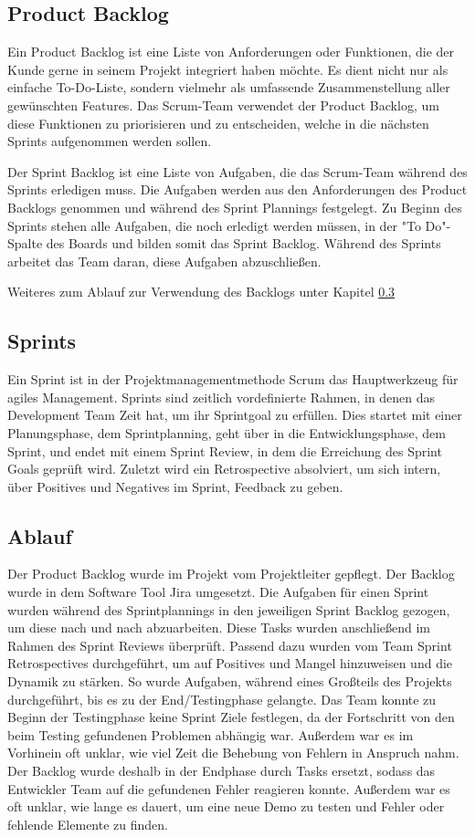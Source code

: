 \subsection{Product Backlog}\label{subsec:product-backlog}
%
Ein Product Backlog ist eine Liste von Anforderungen oder Funktionen, die der Kunde gerne in seinem Projekt integriert haben möchte.
Es dient nicht nur als einfache To-Do-Liste, sondern vielmehr als umfassende Zusammenstellung aller gewünschten Features.
Das Scrum-Team verwendet der Product Backlog, um diese Funktionen zu priorisieren und zu entscheiden, welche in die nächsten Sprints aufgenommen werden sollen.

Der Sprint Backlog ist eine Liste von Aufgaben, die das Scrum-Team während des Sprints erledigen muss.
Die Aufgaben werden aus den Anforderungen des Product Backlogs genommen und während des Sprint Plannings festgelegt.
Zu Beginn des Sprints stehen alle Aufgaben, die noch erledigt werden müssen, in der "To Do"-Spalte des Boards und bilden somit das Sprint Backlog.
Während des Sprints arbeitet das Team daran, diese Aufgaben abzuschließen.

Weiteres zum Ablauf zur Verwendung des Backlogs unter Kapitel \ref{subsec:Ablauf}
%

\subsection{Sprints}\label{subsec:sprints}
%
Ein Sprint ist in der Projektmanagementmethode Scrum das Hauptwerkzeug für agiles Management.
Sprints sind zeitlich vordefinierte Rahmen, in denen das Development Team Zeit hat, um ihr Sprintgoal zu erfüllen.
Dies startet mit einer Planungsphase, dem Sprintplanning, geht über in die Entwicklungsphase, dem Sprint, und endet mit einem Sprint Review, in dem die Erreichung des Sprint Goals geprüft wird.
Zuletzt wird ein Retrospective absolviert, um sich intern, über Positives und Negatives im Sprint, Feedback zu geben. 
%
\subsection{Ablauf}\label{subsec:Ablauf}
Der Product Backlog wurde im Projekt vom Projektleiter gepflegt.
Der Backlog wurde in dem Software Tool Jira umgesetzt.
Die Aufgaben für einen Sprint wurden während des Sprintplannings in den jeweiligen Sprint Backlog gezogen, um diese nach und nach abzuarbeiten.
Diese Tasks wurden anschließend im Rahmen des Sprint Reviews überprüft.
Passend dazu wurden vom Team Sprint Retrospectives durchgeführt, um auf Positives und Mangel hinzuweisen und die Dynamik zu stärken.
So wurde Aufgaben, während eines Großteils des Projekts durchgeführt, bis es zu der End/Testingphase gelangte.
Das Team konnte zu Beginn der Testingphase keine Sprint Ziele festlegen, da der Fortschritt von den beim Testing gefundenen Problemen abhängig war.
Außerdem war es im Vorhinein oft unklar, wie viel Zeit die Behebung von Fehlern in Anspruch nahm.
Der Backlog wurde deshalb in der Endphase durch Tasks ersetzt, sodass das Entwickler Team auf die gefundenen Fehler reagieren konnte.
Außerdem war es oft unklar, wie lange es dauert, um eine neue Demo zu testen und Fehler oder fehlende Elemente zu finden.

